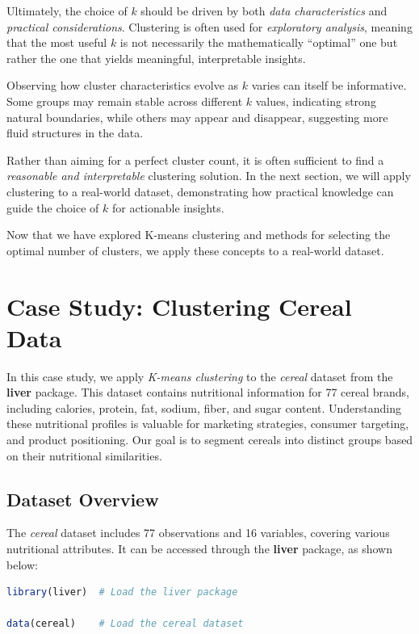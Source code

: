 \documentclass[
]{book}
\theoremstyle{definition}
\theoremstyle{definition}
\theoremstyle{definition}
\theoremstyle{definition}
\theoremstyle{remark}
\begin{document}
Ultimately, the choice of \(k\) should be driven by both \emph{data characteristics} and \emph{practical considerations}. Clustering is often used for \emph{exploratory analysis}, meaning that the most useful \(k\) is not necessarily the mathematically ``optimal'' one but rather the one that yields meaningful, interpretable insights.

Observing how cluster characteristics evolve as \(k\) varies can itself be informative. Some groups may remain stable across different \(k\) values, indicating strong natural boundaries, while others may appear and disappear, suggesting more fluid structures in the data.

Rather than aiming for a perfect cluster count, it is often sufficient to find a \emph{reasonable and interpretable} clustering solution. In the next section, we will apply clustering to a real-world dataset, demonstrating how practical knowledge can guide the choice of \(k\) for actionable insights.

Now that we have explored K-means clustering and methods for selecting the optimal number of clusters, we apply these concepts to a real-world dataset.

\section{Case Study: Clustering Cereal Data}\label{kmeans-cereal}

In this case study, we apply \emph{K-means clustering} to the \emph{cereal} dataset from the \textbf{liver} package. This dataset contains nutritional information for 77 cereal brands, including calories, protein, fat, sodium, fiber, and sugar content. Understanding these nutritional profiles is valuable for marketing strategies, consumer targeting, and product positioning. Our goal is to segment cereals into distinct groups based on their nutritional similarities.

\subsection{Dataset Overview}\label{dataset-overview}

The \emph{cereal} dataset includes 77 observations and 16 variables, covering various nutritional attributes. It can be accessed through the \textbf{liver} package, as shown below:

\begin{lstlisting}[language=R]
library(liver)  # Load the liver package

data(cereal)    # Load the cereal dataset
\end{lstlisting}
\end{document}
